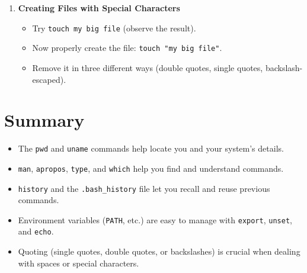 \documentclass[a4paper]{report}
\begin{document}
\begin{enumerate}
    \item \textbf{Creating Files with Special Characters}
    \begin{itemize}
        \item Try \texttt{touch my big file} (observe the result).
        \item Now properly create the file: \texttt{touch "my big file"}.
        \item Remove it in three different ways (double quotes, single quotes, backslash-escaped).
    \end{itemize}
\end{enumerate}

\section*{Summary}
\begin{itemize}
    \item The \texttt{pwd} and \texttt{uname} commands help locate you and your system’s details.
    \item \texttt{man}, \texttt{apropos}, \texttt{type}, and \texttt{which} help you find and understand commands.
    \item \texttt{history} and the \texttt{.bash\_history} file let you recall and reuse previous commands.
    \item Environment variables (\texttt{PATH}, etc.) are easy to manage with \texttt{export}, \texttt{unset}, and \texttt{echo}.
    \item Quoting (single quotes, double quotes, or backslashes) is crucial when dealing with spaces or special characters.
\end{itemize}

\newpage
\end{document}

